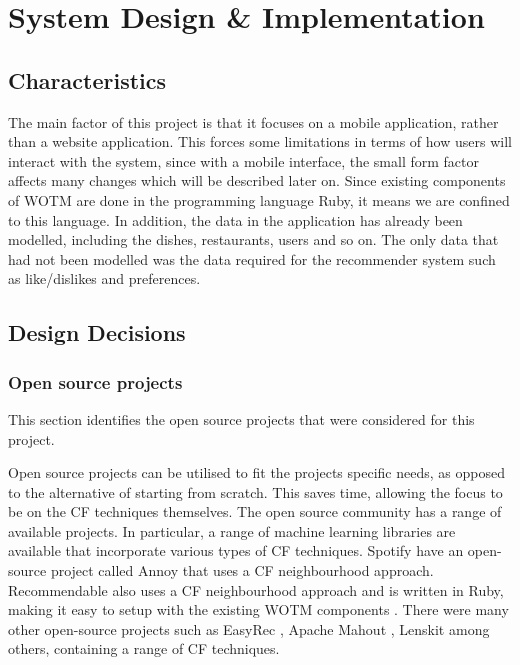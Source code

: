 \chapter{System Design \& Implementation}\label{C:work_done}

\section{Characteristics}

The main factor of this project is that it focuses on a mobile application, rather than a website application. This forces some limitations in terms of how users will interact with the system, since with a mobile interface, the small form factor affects many changes which will be described later on. Since existing components of WOTM are done in the programming language Ruby, it means we are confined to this language. In addition, the data in the application has already been modelled, including the dishes, restaurants, users and so on. The only data that had not been modelled was the data required for the recommender system such as like/dislikes and preferences.   

\section{Design Decisions}

\subsection{Open source projects}
This section identifies the open source projects that were considered for this project.

Open source projects can be utilised to fit the projects specific needs, as opposed to the alternative of starting from scratch. This saves time, allowing the focus to be on the CF techniques themselves. The open source community has a range of available projects. In particular, a range of machine learning libraries are available that incorporate various types of CF techniques. Spotify \cite{annoy} have an open-source project called Annoy \cite{annoy} that uses a CF neighbourhood approach. Recommendable \cite{recommendable} also uses a CF neighbourhood approach and is written in Ruby, making it easy to setup with the existing WOTM components \cite{recommendable}. There were many other open-source projects such as EasyRec \cite{easyrec}, Apache Mahout \cite{mahoutaction}, Lenskit \cite{lenskit} among others, containing a range of CF techniques. 

